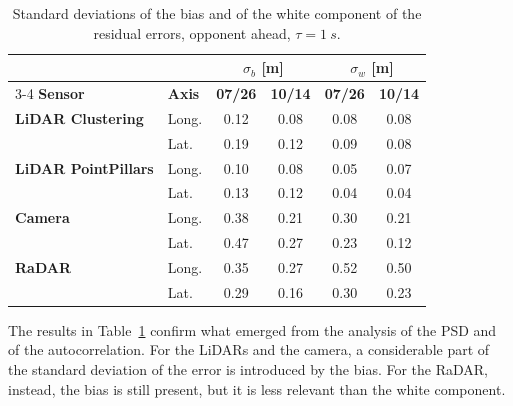 \begin{table}[H]
\centering
\small
\setlength{\tabcolsep}{4pt}
\begin{tabular}{|llcccc|}
\hline
 \rowcolor{bluepoli!40} & &\multicolumn{2}{c}{\textbf{$\sigma_b$ [m]}}&\multicolumn{2}{c|}{\textbf{$\sigma_w$ [m]}} \\
\cline{3-4}\cline{5-6}
\rowcolor{bluepoli!40} \textbf{Sensor} & \textbf{Axis} & \textbf{07/26} & \textbf{10/14} & \textbf{07/26} & \textbf{10/14} \\
\hline\hline
\textbf{LiDAR Clustering} & Long. & 0.12 & 0.08 & 0.08 & 0.08 \\
 & Lat. & 0.19 & 0.12 & 0.09 & 0.08 \\
\hline
\textbf{LiDAR PointPillars} & Long. & 0.10 & 0.08 & 0.05 & 0.07 \\
 & Lat. & 0.13 & 0.12 & 0.04 & 0.04 \\
\hline
\textbf{Camera} & Long. & 0.38 & 0.21 & 0.30 & 0.21 \\
 & Lat. & 0.47 & 0.27 & 0.23 & 0.12 \\
\hline
\textbf{RaDAR} & Long. & 0.35 & 0.27 & 0.52 & 0.50 \\
 & Lat. & 0.29 & 0.16 & 0.30 & 0.23 \\
\hline
\end{tabular}
\caption{Standard deviations of the bias and of the white component of the residual
errors, opponent ahead, $\tau = \SI{1}{s}$.}
\label{tab:gm_sigmas}
\end{table}

The results in Table~\ref{tab:gm_sigmas} confirm what emerged from the analysis of the PSD
and of the autocorrelation. For the LiDARs and the camera, a considerable part of the
standard deviation of the error is introduced by the bias. For the RaDAR, instead, the
bias is still present, but it is less relevant than the white component.

